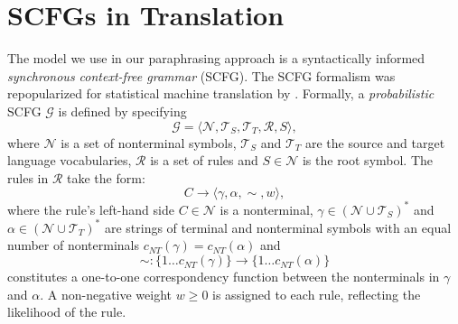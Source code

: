 \documentclass[11pt]{article}
\newcommand{\mnote}[1]{\marginpar{%
  \vskip-\baselineskip
  \raggedright\footnotesize
  \itshape\hrule\smallskip\footnotesize{#1}\par\smallskip\hrule}}
\begin{document}


\section{SCFGs in Translation} \label{formalism}

The model we use in our paraphrasing approach is a syntactically
informed \emph{ synchronous context-free grammar} (SCFG).  The SCFG
formalism \cite{Aho1972} was repopularized for statistical machine
translation by .  Formally, a \emph{probabilistic}
SCFG $\mathcal{G}$ is defined by specifying
\[
\mathcal{G} = \langle \mathcal{N}, \mathcal{T}_S, \mathcal{T}_T,
\mathcal{R}, S \rangle ,
\]
where $\mathcal{N}$ is a set of nonterminal symbols, $\mathcal{T}_S$
and $\mathcal{T}_T$ are the source and target language vocabularies,
$\mathcal{R}$ is a set of rules and $S \in \mathcal{N}$ is the root
symbol. The rules in $\mathcal{R}$ take the form:
\begin{equation*}
  C \rightarrow \langle \gamma, \alpha, \sim, w \rangle ,
\end{equation*}
where the rule's left-hand side $C \in \mathcal{N}$ is a nonterminal,
$\gamma \in (\mathcal{N} \cup \mathcal{T}_S)^*$ and $\alpha \in
(\mathcal{N} \cup \mathcal{T}_T)^*$ are strings of terminal and
nonterminal symbols with an equal number of nonterminals
$c_{\mathit{NT}}(\gamma) = c_{\mathit{NT}}(\alpha)$ and
$$
\sim : \{1 \ldots c_{\mathit{NT}}(\gamma)\} \rightarrow \{1 \ldots
c_{\mathit{NT}}(\alpha)\}
$$ 
constitutes a one-to-one correspondency function between the
nonterminals in $\gamma$ and $\alpha$. A non-negative weight $w \geq
0$ is assigned to each rule, reflecting the likelihood of the rule.
\end{document}
